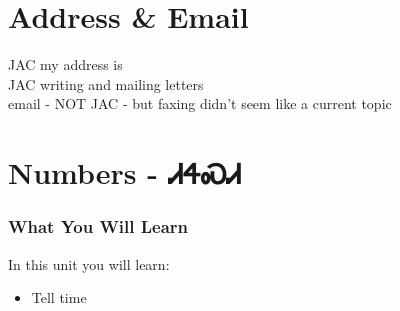 \chapter{Address \& Email}
JAC my address is\\
JAC writing and mailing letters\\
email - NOT JAC - but faxing didn't seem like a current topic\\
\chapter{Numbers - ᏗᏎᏍᏗ}
\subsection{What You Will Learn}
In this unit you will learn:
\begin{itemize}
\item Tell time
\end{itemize}\newpage


